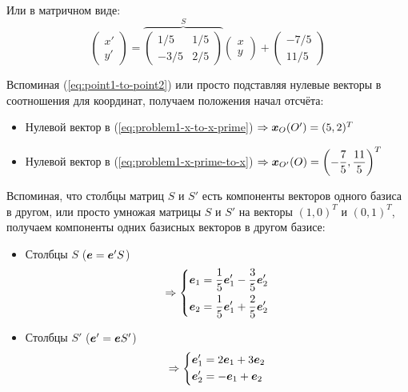\documentclass[a4paper,12pt]{article}
\begin{document}
\begin{solution}
    Или в матричном виде:
    \begin{equation}\label{eq:problem1-x-prime-to-x}
      \begin{pmatrix}
        x'\\
        y'
      \end{pmatrix}
      = \overbrace{\begin{pmatrix}
        1/5 & 1/5\\
        -3/5 & 2/5
      \end{pmatrix}}^{S}
      \begin{pmatrix}
        x\\
        y
      \end{pmatrix}
      + \begin{pmatrix}
        -7/5\\
        11/5
      \end{pmatrix}
    \end{equation}
    
    
    Вспоминая (\ref{eq:point1-to-point2}) или просто подставляя нулевые векторы в соотношения для координат, получаем положения начал отсчёта:
    \begin{itemize}
      \item Нулевой вектор в (\ref{eq:problem1-x-to-x-prime}) $\Rightarrow \boldsymbol x_O(O') = (5, 2)^T$
      \item Нулевой вектор в (\ref{eq:problem1-x-prime-to-x}) $\Rightarrow \boldsymbol x_{O'}(O) = \left(-\dfrac{7}{5}, \dfrac{11}{5}\right)^T$
    \end{itemize}
    
    Вспоминая, что столбцы матриц $S$ и $S'$ есть компоненты векторов одного базиса в другом, или просто умножая матрицы $S$ и $S'$ на векторы $(1, 0)^T$ и $(0, 1)^T$, получаем компоненты одних базисных векторов в другом базисе:
    \begin{itemize}
      \item Столбцы $S$ ($\bds e \hm= \bds e' S$)
        \[
          \Rightarrow \left\{
            \begin{aligned}
              &\boldsymbol e_1 = \frac{1}{5} \boldsymbol e_1' - \frac{3}{5} \boldsymbol e_2'\\
              &\boldsymbol e_2 = \frac{1}{5} \boldsymbol e_1' + \frac{2}{5} \boldsymbol e_2'
            \end{aligned}
          \right.
        \]
      \item Столбцы $S'$ ($\bds e' \hm= \bds e S'$)
        \[
          \Rightarrow \left\{
            \begin{aligned}
              &\boldsymbol e_1' = 2 \boldsymbol e_1 + 3 \boldsymbol e_2\\
              &\boldsymbol e_2' = -\boldsymbol e_1 + \boldsymbol e_2
            \end{aligned}
          \right.
        \]
    \end{itemize}
  \end{solution}
  
\end{document}
